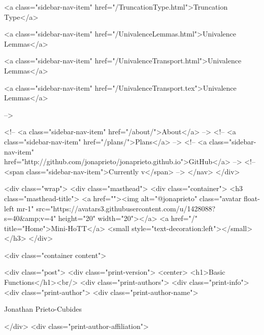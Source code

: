       
    
      
        
          <a class="sidebar-nav-item" href="/TruncationType.html">Truncation Type</a>
        
      
    
      
        
          <a class="sidebar-nav-item" href="/UnivalenceLemmas.html">Univalence Lemmas</a>
        
      
    
      
        
          <a class="sidebar-nav-item" href="/UnivalenceTransport.html">Univalence Lemmas</a>
        
      
    
      
        
          <a class="sidebar-nav-item" href="/UnivalenceTransport.tex">Univalence Lemmas</a>
        
      
     -->

    <!-- <a class="sidebar-nav-item" href="/about/">About</a> -->
    <!-- <a class="sidebar-nav-item" href="/plans/">Plans</a> -->
    <!-- <a class="sidebar-nav-item" href="http://github.com/jonaprieto/jonaprieto.github.io">GitHub</a> -->
    <!-- <span class="sidebar-nav-item">Currently v</span> -->
  </nav>
</div>

    <div class="wrap">
      <div class="masthead">
        <div class="container">
          <h3 class="masthead-title">
            <a href=""><img alt="@jonaprieto" class="avatar float-left mr-1" src="https://avatars3.githubusercontent.com/u/1428088?s=40&amp;v=4" height="20" width="20"></a>
            <a href="/" title="Home">Mini-HoTT</a>
            <small style="text-decoration:left"></small>
          </h3>
        </div>
      
      <div class="container content">
        







<div class="post">
  <div class="print-version">
    <center>
      <h1>Basic Functions</h1><br/>
        <div class="print-authors">
          <div class="print-info">
            <div class="print-author">
              <div class="print-author-name">
                
                  Jonathan Prieto-Cubides
                
              </div>
              <div class="print-author-affiliation">
                
